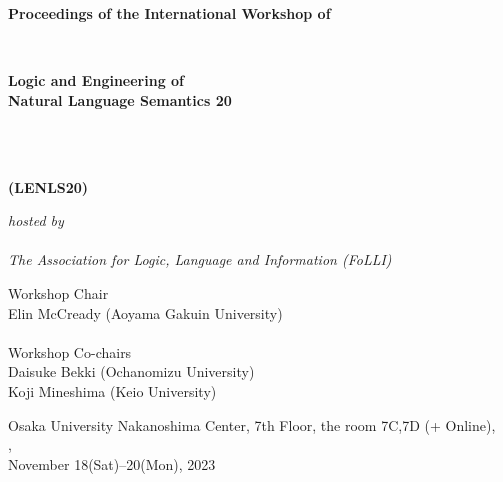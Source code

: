 \documentclass[12pt]{jarticle}
\begin{document}
\pagestyle{empty}

\vspace*{1cm}

\begin{center}

\begin{Large}
{\bf Proceedings of the International Workshop of}
\end{Large} 
\\
\begin{huge}
{\bf Logic and Engineering of \\
Natural Language Semantics 20} 
\end{huge}
\\\ \\
\begin{huge}
{\bf (LENLS20)}
\end{huge}

\vspace*{1cm}

\begin{Large}
{\em hosted by \\\ \\ The Association for Logic, Language and Information (FoLLI)}
\end{Large}

\begin{large}
\vspace*{1cm}
Workshop Chair\\ $\;$\\
Elin McCready (Aoyama Gakuin University) \\
\ \\
Workshop Co-chairs\\ $\;$\\
Daisuke Bekki (Ochanomizu University) \\
Koji Mineshima (Keio University) \\

\end{large}

\vspace*{3cm}


\vspace*{1cm}

\begin{large}
Osaka University Nakanoshima Center, 7th Floor, the room 7C,7D (+ Online), \\
, \\
November 18(Sat)--20(Mon), 2023
\end{large}
\vfill

\end{center}
\end{document}
